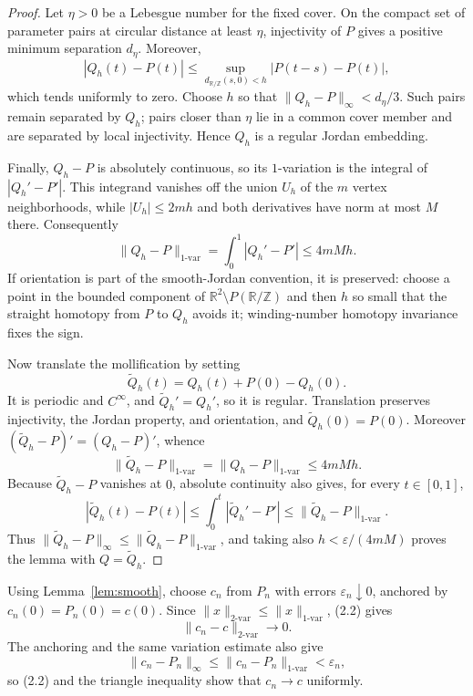 \documentclass[11pt]{article}
\theoremstyle{definition}
\theoremstyle{remark}
\newcommand{\R}{\mathbb R}
\newcommand{\T}{\mathbb R/\mathbb Z}
\begin{document}
\begin{proof}
Let $\eta>0$ be a Lebesgue number for the fixed cover.  On the compact set of
parameter pairs at circular distance at least $\eta$, injectivity of $P$
gives a positive minimum separation $d_\eta$.  Moreover,
\[
 |Q_h(t)-P(t)|\leq
 \sup_{d_{\T}(s,0)<h}|P(t-s)-P(t)|,
\]
which tends uniformly to zero.  Choose $h$ so that
$\|Q_h-P\|_\infty<d_\eta/3$.  Such pairs remain separated by $Q_h$; pairs
closer than $\eta$ lie in a common cover member and are separated by local
injectivity.  Hence $Q_h$ is a regular Jordan embedding.

Finally, $Q_h-P$ is absolutely continuous, so its $1$-variation is the
integral of $|Q_h'-P'|$.  This integrand vanishes off the union $U_h$ of the
$m$ vertex neighborhoods, while $|U_h|\leq2mh$ and both derivatives have
norm at most $M$ there.  Consequently
\[
 \|Q_h-P\|_{1\text{-var}}
 =\int_0^1|Q_h'-P'|\leq4mMh.
\]
If orientation is part of
the smooth-Jordan convention, it is preserved: choose a point in the bounded
component of $\R^2\setminus P(\T)$ and
then $h$ so small that the straight homotopy from $P$ to $Q_h$ avoids it;
winding-number homotopy invariance fixes the sign.

Now translate the mollification by setting
\[
 \widetilde Q_h(t)=Q_h(t)+P(0)-Q_h(0).
\]
It is periodic and $C^\infty$, and $\widetilde Q_h'=Q_h'$, so it is regular.
Translation preserves injectivity, the Jordan property, and orientation, and
$\widetilde Q_h(0)=P(0)$.  Moreover
$(\widetilde Q_h-P)'=(Q_h-P)'$, whence
\[
 \|\widetilde Q_h-P\|_{1\text{-var}}
 =\|Q_h-P\|_{1\text{-var}}\leq4mMh.                    \tag{3.3}
\]
Because $\widetilde Q_h-P$ vanishes at $0$, absolute continuity also gives,
for every $t\in[0,1]$,
\[
 |\widetilde Q_h(t)-P(t)|
 \leq\int_0^t|\widetilde Q_h'-P'|
 \leq\|\widetilde Q_h-P\|_{1\text{-var}}.             \tag{3.4}
\]
Thus $\|\widetilde Q_h-P\|_\infty\leq
\|\widetilde Q_h-P\|_{1\text{-var}}$, and taking also
$h<\varepsilon/(4mM)$ proves the lemma with $Q=\widetilde Q_h$.
\end{proof}

Using Lemma~\ref{lem:smooth}, choose $c_n$ from $P_n$ with errors
$\varepsilon_n\downarrow0$, anchored by $c_n(0)=P_n(0)=c(0)$.  Since
$\|x\|_{2\text{-var}}\leq\|x\|_{1\text{-var}}$, (2.2) gives
\[
 \|c_n-c\|_{2\text{-var}}\to0.                         \tag{3.5}
\]
The anchoring and the same variation estimate also give
\[
 \|c_n-P_n\|_\infty
 \leq\|c_n-P_n\|_{1\text{-var}}<\varepsilon_n,
\]
so (2.2) and the triangle inequality show that $c_n\to c$ uniformly.
\end{document}

